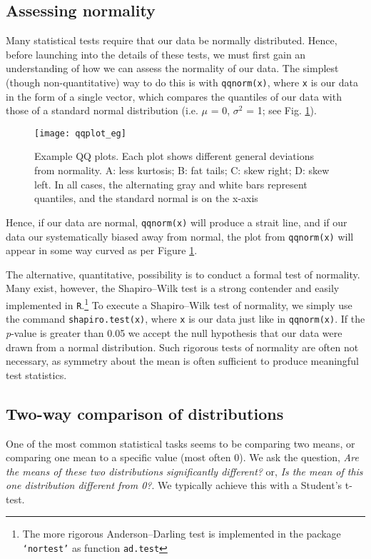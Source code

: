 \documentclass[12pt]{article}
\begin{document}
\subsection{Assessing normality}	\label{sec:normTest}
Many statistical tests require that our data be normally distributed.  Hence, before launching into the details of these tests, we must first gain an understanding of how we can assess the normality of our data.  The simplest (though non-quantitative) way to do this is with \verb+qqnorm(x)+, where \verb+x+ is our data in the form of a single vector, which compares the quantiles of our data with those of a standard normal distribution (i.e. $\mu$ = 0, $\sigma^2$ = 1; see Fig. \ref{qqplot}).

\begin{figure}[!hbt]
	\centering
	\texttt{[image: qqplot\_eg]}
	\caption[Example QQ plots]{Example QQ plots.  Each plot shows different general deviations from normality. A: less kurtosis; B: fat tails; C: skew right; D: skew left.  In all 						    cases, the alternating gray and white bars represent quantiles, and the standard normal is on the x-axis}
	\label{qqplot}
\end{figure}

Hence, if our data are normal, \verb+qqnorm(x)+ will produce a strait line, and if our data our systematically biased away from normal, the plot from \verb+qqnorm(x)+ will appear in some way curved as per Figure \ref{qqplot}.

The alternative, quantitative, possibility is to conduct a formal test of normality.  Many exist, however, the Shapiro--Wilk test is a strong contender and easily implemented in \verb+R+.\footnote{The more rigorous Anderson--Darling test is implemented in the package \texttt{`nortest'} as function \texttt{ad.test}}  To execute a Shapiro--Wilk test of normality, we simply use the command \verb+shapiro.test(x)+, where \verb+x+ is our data just like in \verb+qqnorm(x)+.  If the \emph{p}-value is greater than 0.05 we accept the null hypothesis that our data were drawn from a normal distribution.  Such rigorous tests of normality are often not necessary, as symmetry about the mean is often sufficient to produce meaningful test statistics.

\subsection{Two-way comparison of distributions}
One of the most common statistical tasks seems to be comparing two means, or comparing one mean to a specific value (most often 0).  We ask the question, \emph{Are the means of these two distributions significantly different?} or, \emph{Is the mean of this one distribution different from 0?}.  We typically achieve this with a Student's t-test.
\end{document}
